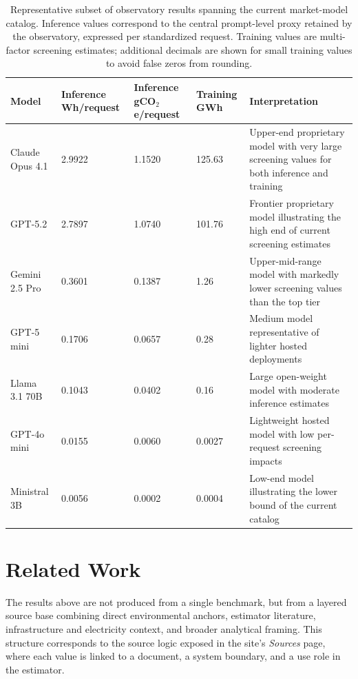 \documentclass[runningheads]{llncs}
\begin{document}
\begin{table}[htbp]
\centering
\small
\begin{tabularx}{\textwidth}{|L{3.5cm}|L{1.8cm}|L{2.2cm}|L{1.4cm}|Y|}
\hline
Model & Inference Wh/request & Inference gCO$_2$e/request & Training GWh & Interpretation \\
\hline
Claude Opus 4.1 & 2.9922 & 1.1520 & 125.63 & Upper-end proprietary model with very large screening values for both inference and training \\
\hline
GPT-5.2 & 2.7897 & 1.0740 & 101.76 & Frontier proprietary model illustrating the high end of current screening estimates \\
\hline
Gemini 2.5 Pro & 0.3601 & 0.1387 & 1.26 & Upper-mid-range model with markedly lower screening values than the top tier \\
\hline
GPT-5 mini & 0.1706 & 0.0657 & 0.28 & Medium model representative of lighter hosted deployments \\
\hline
Llama 3.1 70B & 0.1043 & 0.0402 & 0.16 & Large open-weight model with moderate inference estimates \\
\hline
GPT-4o mini & 0.0155 & 0.0060 & 0.0027 & Lightweight hosted model with low per-request screening impacts \\
\hline
Ministral 3B & 0.0056 & 0.0002 & 0.0004 & Low-end model illustrating the lower bound of the current catalog \\
\hline
\end{tabularx}
\caption{Representative subset of observatory results spanning the current market-model catalog. Inference values correspond to the central prompt-level proxy retained by the observatory, expressed per standardized request. Training values are multi-factor screening estimates; additional decimals are shown for small training values to avoid false zeros from rounding.}
\label{tab:representative-models}
\end{table}

\section{Related Work}
The results above are not produced from a single benchmark, but from a layered source base combining direct environmental anchors, estimator literature, infrastructure and electricity context, and broader analytical framing. This structure corresponds to the source logic exposed in the site's \emph{Sources} page, where each value is linked to a document, a system boundary, and a use role in the estimator.
\end{document}
